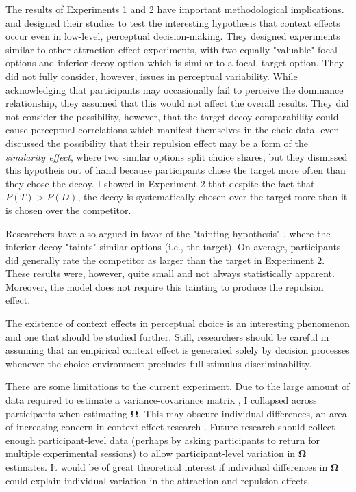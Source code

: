 The results of Experiments 1 and 2 have important methodological implications. \textcite{trueblood2013not} and \textcite{spektorWhenGoodLooks2018b} designed their studies to test the interesting hypothesis that context effects occur even in low-level, perceptual decision-making. They designed experiments similar to other attraction effect experiments, with two equally "valuable" focal options and inferior decoy option which is similar to a focal, target option. They did not fully consider, however, issues in perceptual variability. While acknowledging that participants may occasionally fail to perceive the dominance relationship, they assumed that this would not affect the overall results. They did not consider the possibility, however, that the target-decoy comparability could cause perceptual correlations which manifest themselves in the choie data. \textcite{spektorWhenGoodLooks2018b} even discussed the possibility that their repulsion effect may be a form of the \textit{similarity effect}, where two similar options split choice shares, but they dismissed this hypotheis out of hand because participants chose the target more often than they chose the decoy. I showed in Experiment 2 that despite the fact that $P(T)>P(D)$, the decoy is systematically chosen over the target more than it is chosen over the competitor. 

Researchers have also argued in favor of the "tainting hypothesis" \parencite{simonson2014vices,spektorWhenGoodLooks2018b}, where the inferior decoy "taints" similar options (i.e., the target). On average, participants did generally rate the competitor as larger than the target in Experiment 2. These results were, however, quite small and not always statistically apparent. Moreover, the model does not require this tainting to produce the repulsion effect.

The existence of context effects in perceptual choice is an interesting phenomenon and one that should be studied further. Still, researchers should be careful in assuming that an empirical context effect is generated solely by decision processes whenever the choice environment precludes full stimulus discriminability.

There are some limitations to the current experiment. Due to the large amount of data required to estimate a variance-covariance matrix \parencite{martin2021,merkle2023opaque}, I collapsed across participants when estimating $\boldsymbol{\Omega}$. This may obscure individual differences, an area of increasing concern in context effect research \parencite{liewAppropriacyAveragingStudy2016b,trueblood2015fragile,davis2023illustrated}. Future research should collect enough participant-level data (perhaps by asking participants to return for multiple experimental sessions) to allow participant-level variation in $\boldsymbol{\Omega}$ estimates. It would be of great theoretical interest if individual differences in $\boldsymbol{\Omega}$ could explain individual variation in the attraction and repulsion effects.

